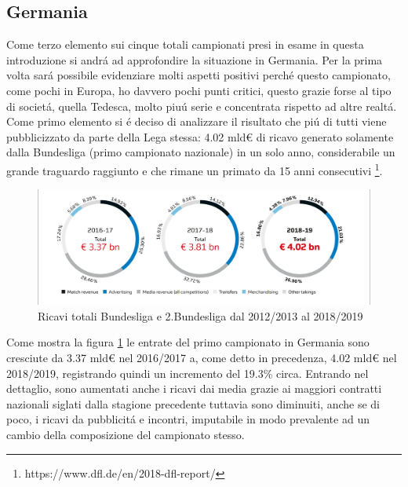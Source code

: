 \documentclass[
    corpo=11.5pt,
    oneside,
    evenboxes,
    tipotesi=triennale,
    stile=classica,
    oldstyle,
    autoretitolo,
    greek,
]{toptesi}
\begin{document}
\begin{interlinea}{1.5}
\subsection{Germania}
Come terzo elemento sui cinque totali campionati presi in esame in questa introduzione si andr\'a ad approfondire la situazione
in Germania. Per la prima volta sar\'a possibile evidenziare molti aspetti positivi perch\'e questo campionato, come pochi in Europa,
ho davvero pochi punti critici, questo grazie forse al tipo di societ\'a, quella Tedesca, molto piu\'u serie e concentrata rispetto
ad altre realt\'a.\\
Come primo elemento si \'e deciso di analizzare il risultato che pi\'u di tutti viene pubblicizzato da parte della Lega stessa: 
4.02 mld€ di ricavo generato solamente dalla Bundesliga (primo campionato nazionale) in un solo anno,
considerabile un grande traguardo raggiunto e che rimane un primato da 15 anni consecutivi
\footnote{https://www.dfl.de/en/2018-dfl-report/}.
\newpage
\begin{figure}
    \centering
    \includegraphics[scale=.5]{img/bundes_entrate.png}
    \caption{Ricavi totali Bundesliga e 2.Bundesliga dal 2012/2013 al 2018/2019}
    \label{entrate_bundes}
\end{figure}
Come mostra la figura \ref{entrate_bundes} le entrate del primo campionato in Germania sono cresciute da 3.37 mld€ nel 2016/2017
a, come detto in precedenza, 4.02 mld€ nel 2018/2019, registrando quindi un incremento del 19.3\% circa. Entrando nel dettaglio, sono aumentati
anche i ricavi dai media grazie ai maggiori contratti nazionali siglati dalla stagione precedente tuttavia sono diminuiti, anche se di poco,
i ricavi da pubblicit\'a e incontri, imputabile in modo prevalente ad un cambio della composizione del campionato stesso.


\end{interlinea}
\end{document}
